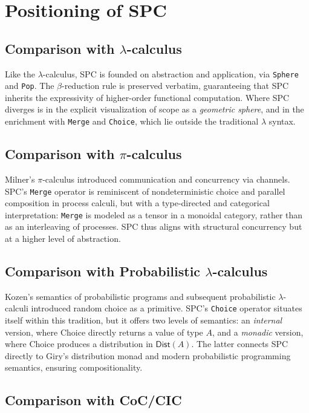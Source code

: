 \documentclass{article}
\begin{document}
\section{Positioning of SPC}\label{sec:positioning}

\subsection{Comparison with $\lambda$-calculus}

Like the $\lambda$-calculus, SPC is founded on abstraction and application,
via \texttt{Sphere} and \texttt{Pop}. The $\beta$-reduction rule is preserved
verbatim, guaranteeing that SPC inherits the expressivity of higher-order
functional computation. Where SPC diverges is in the explicit visualization of
scope as a \emph{geometric sphere}, and in the enrichment with \texttt{Merge}
and \texttt{Choice}, which lie outside the traditional $\lambda$ syntax.

\subsection{Comparison with $\pi$-calculus}

Milner’s $\pi$-calculus introduced communication and concurrency via channels.
SPC’s \texttt{Merge} operator is reminiscent of nondeterministic choice and
parallel composition in process calculi, but with a type-directed and
categorical interpretation: \texttt{Merge} is modeled as a tensor in a monoidal
category, rather than as an interleaving of processes. SPC thus aligns with
structural concurrency but at a higher level of abstraction.

\subsection{Comparison with Probabilistic $\lambda$-calculus}

Kozen’s semantics of probabilistic programs and subsequent probabilistic
$\lambda$-calculi introduced random choice as a primitive. SPC’s
\texttt{Choice} operator situates itself within this tradition, but it offers
two levels of semantics: an \emph{internal} version, where Choice directly
returns a value of type $A$, and a \emph{monadic} version, where Choice
produces a distribution in $\mathsf{Dist}(A)$. The latter connects SPC
directly to Giry’s distribution monad and modern probabilistic programming
semantics, ensuring compositionality.

\subsection{Comparison with CoC/CIC}
\end{document}
